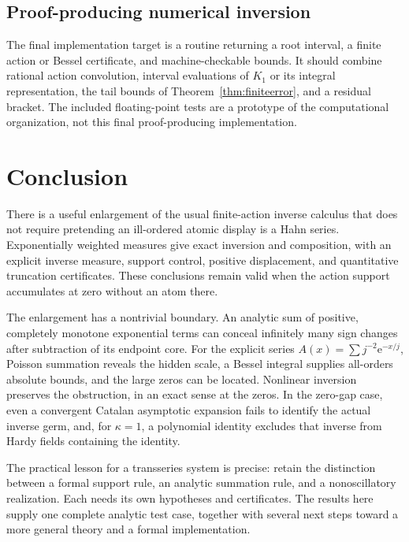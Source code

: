 \documentclass[11pt,a4paper]{article}
\theoremstyle{definition}
\theoremstyle{remark}
\newcommand{\e}{\mathrm e}
\numberwithin{equation}{section}
\begin{document}
\subsection{Proof-producing numerical inversion}
The final implementation target is a routine returning a root interval, a finite action or Bessel certificate, and machine-checkable bounds. It should combine rational action convolution, interval evaluations of $K_1$ or its integral representation, the tail bounds of Theorem~\ref{thm:finiteerror}, and a residual bracket. The included floating-point tests are a prototype of the computational organization, not this final proof-producing implementation.

\section{Conclusion}
There is a useful enlargement of the usual finite-action inverse calculus that does not require pretending an ill-ordered atomic display is a Hahn series. Exponentially weighted measures give exact inversion and composition, with an explicit inverse measure, support control, positive displacement, and quantitative truncation certificates. These conclusions remain valid when the action support accumulates at zero without an atom there.

The enlargement has a nontrivial boundary. An analytic sum of positive, completely monotone exponential terms can conceal infinitely many sign changes after subtraction of its endpoint core. For the explicit series $A(x)=\sum j^{-2}\e^{-x/j}$, Poisson summation reveals the hidden scale, a Bessel integral supplies all-orders absolute bounds, and the large zeros can be located. Nonlinear inversion preserves the obstruction, in an exact sense at the zeros. In the zero-gap case, even a convergent Catalan asymptotic expansion fails to identify the actual inverse germ, and, for $\kappa=1$, a polynomial identity excludes that inverse from Hardy fields containing the identity.

The practical lesson for a transseries system is precise: retain the distinction between a formal support rule, an analytic summation rule, and a nonoscillatory realization. Each needs its own hypotheses and certificates. The results here supply one complete analytic test case, together with several next steps toward a more general theory and a formal implementation.

\appendix
\end{document}
